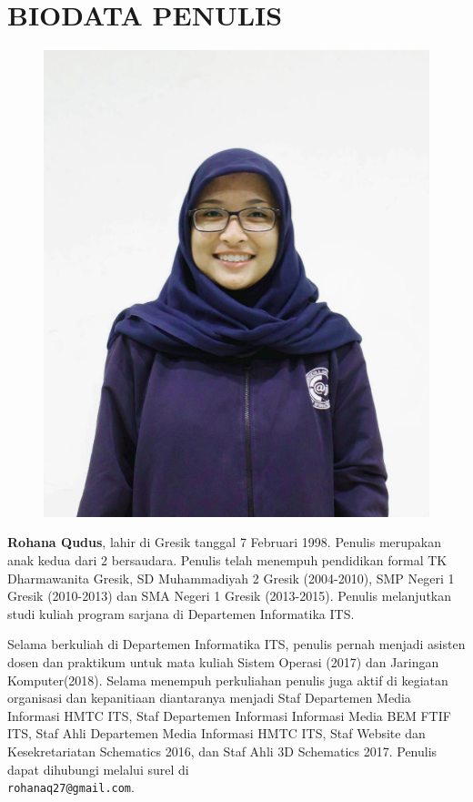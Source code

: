 \chapter{BIODATA PENULIS}
\begin{figure}
\includegraphics[height=0.3\textheight]{biodata/hana.png}
\end{figure}

\textbf{Rohana Qudus}, lahir di Gresik tanggal 7 Februari 1998. Penulis merupakan anak kedua dari 2 bersaudara. Penulis telah menempuh pendidikan formal TK Dharmawanita Gresik, SD Muhammadiyah 2 Gresik (2004-2010), SMP Negeri 1 Gresik (2010-2013) dan SMA Negeri 1 Gresik (2013-2015). Penulis melanjutkan studi kuliah program sarjana di Departemen Informatika ITS. 

Selama berkuliah di Departemen Informatika ITS, penulis  pernah menjadi asisten dosen dan praktikum untuk mata kuliah Sistem Operasi (2017) dan Jaringan Komputer(2018). Selama menempuh perkuliahan penulis juga aktif di kegiatan organisasi dan kepanitiaan diantaranya menjadi Staf Departemen Media Informasi HMTC ITS, Staf Departemen Informasi Informasi Media BEM FTIF ITS, Staf Ahli Departemen Media Informasi HMTC ITS, Staf Website dan Kesekretariatan Schematics 2016, dan Staf Ahli 3D Schematics 2017. Penulis dapat dihubungi melalui surel di \\ \texttt{rohanaq27@gmail.com}.

